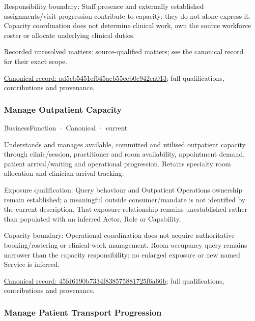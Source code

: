 Responsibility boundary: Staff presence and externally established assignments/visit progression contribute to capacity; they do not alone express it. Capacity coordination does not determine clinical work, own the source workforce roster or allocate underlying clinical duties.


{\small Recorded unresolved matters: source-qualified matters; see the canonical record for their exact scope.}\par
{\footnotesize \href{../../../../continuum/business/business-function/ad5cb5451ef645acb55ceb0c942ea013.md}{Canonical record: ad5cb5451ef645acb55ceb0c942ea013}; full qualifications, contributions and provenance.}\par
\subsubsection{Manage Outpatient Capacity}

\label{element:45fd6190b7334f838575881725f6a66b}
{\small BusinessFunction · Canonical · current}\par

Understands and manages available, committed and utilised outpatient capacity through clinic/session, practitioner and room availability, appointment demand, patient arrival/waiting and operational progression. Retains specialty room allocation and clinician arrival tracking.



Exposure qualification: Query behaviour and Outpatient Operations ownership remain established; a meaningful outside consumer/mandate is not identified by the current description. That exposure relationship remains unestablished rather than populated with an inferred Actor, Role or Capability.



Capacity boundary: Operational coordination does not acquire authoritative booking/rostering or clinical-work management. Room-occupancy query remains narrower than the capacity responsibility; no enlarged exposure or new named Service is inferred.


{\footnotesize \href{../../../../continuum/business/business-function/45fd6190b7334f838575881725f6a66b.md}{Canonical record: 45fd6190b7334f838575881725f6a66b}; full qualifications, contributions and provenance.}\par
\subsubsection{Manage Patient Transport Progression}


